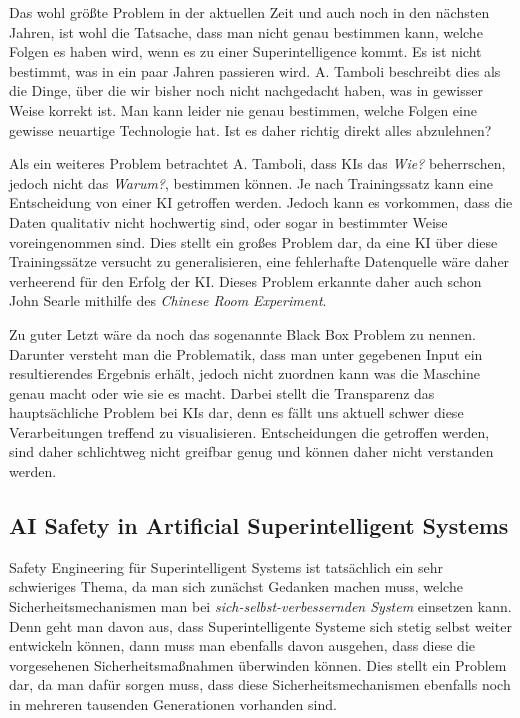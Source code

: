         Das wohl größte Problem in der aktuellen Zeit und auch noch in den nächsten Jahren, ist wohl die Tatsache, dass
        man nicht genau bestimmen kann, welche Folgen es haben wird, wenn es zu einer Superintelligence kommt.
        \cite[p. 21]{Tamboli2019} Es ist nicht bestimmt, was in ein paar Jahren passieren wird. A. Tamboli beschreibt
        dies als die Dinge, über die wir bisher noch nicht nachgedacht haben, was in gewisser Weise korrekt ist.
        Man kann leider nie genau bestimmen, welche Folgen eine gewisse neuartige Technologie hat. Ist es daher richtig
        direkt alles abzulehnen?

        Als ein weiteres Problem betrachtet A. Tamboli, dass KIs das \textit{Wie?} beherrschen, jedoch nicht das
        \textit{Warum?}, bestimmen können.\cite[p. 24]{Tamboli2019} Je nach Trainingssatz kann eine Entscheidung von
        einer KI getroffen werden. Jedoch kann es vorkommen, dass die Daten qualitativ nicht hochwertig sind, oder sogar
        in bestimmter Weise voreingenommen sind. Dies stellt ein großes Problem dar, da eine KI über diese Trainingssätze
        versucht zu generalisieren, eine fehlerhafte Datenquelle wäre daher verheerend für den Erfolg der KI. Dieses
        Problem erkannte daher auch schon John Searle mithilfe des \textit{Chinese Room Experiment}.\cite{cole_2014}

        Zu guter Letzt wäre da noch das sogenannte Black Box Problem zu nennen. Darunter versteht man die Problematik,
        dass man unter gegebenen Input ein resultierendes Ergebnis erhält, jedoch nicht zuordnen kann was die Maschine
        genau macht oder wie sie es macht. \cite{zednik2019solving} Darbei stellt die Transparenz das hauptsächliche
        Problem bei KIs dar, denn es fällt uns aktuell schwer diese Verarbeitungen treffend zu visualisieren.
        Entscheidungen die getroffen werden, sind daher schlichtweg nicht greifbar genug und können daher nicht verstanden
        werden.

        \subsection{AI Safety in Artificial Superintelligent Systems}

        Safety Engineering für Superintelligent Systems ist tatsächlich ein sehr schwieriges Thema, da man sich
        zunächst Gedanken machen muss, welche Sicherheitsmechanismen man bei \textit{sich-selbst-verbessernden System}
        einsetzen kann.\cite[p. 9]{yampolskiy2013safety} Denn geht man davon aus, dass Superintelligente Systeme sich
        stetig selbst weiter entwickeln können, dann muss man ebenfalls davon ausgehen, dass diese die vorgesehenen
        Sicherheitsmaßnahmen überwinden können. Dies stellt ein Problem dar, da man dafür sorgen muss, dass diese
        Sicherheitsmechanismen ebenfalls noch in mehreren tausenden Generationen vorhanden sind.

